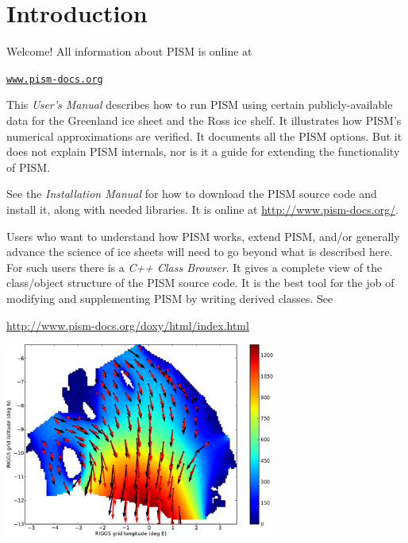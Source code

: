 \documentclass[titlepage,letterpaper,final]{scrartcl}
\renewcommand{\t}[1]{\texttt{#1}}
\begin{document}
\newpage
\setcounter{tocdepth}{3}
\small
\tableofcontents
\normalsize

\newpage


\section{Introduction}\label{sect:intro}

Welcome!  All information about PISM is online at
\begin{center}
  \href{http://www.pism-docs.org}{\t{www.pism-docs.org}}
\end{center}

This \emph{User's Manual} describes how to run PISM using certain publicly-available data for the Greenland ice sheet and the Ross ice shelf.  It illustrates how PISM's numerical approximations are verified.  It documents all the PISM options.  But it does not explain PISM internals, nor is it a guide for extending the functionality of PISM.

See the \emph{Installation Manual} for how to download the PISM source code and install it, along with needed libraries.  It is online at \url{http://www.pism-docs.org/}.

Users who want to understand how PISM works, extend PISM, and/or generally advance the science of ice sheets will need to go beyond what is described here.  For such users there is a \emph{C++ Class Browser}.  It gives a complete view of the class/object structure of the PISM source code.  It is the best tool for the job of modifying and supplementing PISM by writing derived classes.  See
\begin{center}
  \url{http://www.pism-docs.org/doxy/html/index.html}
\end{center}

\vspace{.4in}
  
\begin{center}
\includegraphics[width=3.5in,keepaspectratio=true]{rossquiver}
\end{center}
\end{document}
